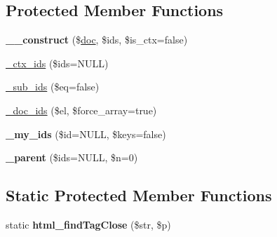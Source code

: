 \subsection*{Protected Member Functions}
\begin{DoxyCompactItemize}
\item 
\mbox{\label{classduzun_1_1hQuery_1_1Node_aab1867ee99ebcff2d6d7c85e953ffeec}} 
{\bfseries \+\_\+\+\_\+construct} (\$\mbox{\hyperlink{classduzun_1_1hQuery_1_1Node_abd060c044c66e49189d8e4fb491f3b3d}{doc}}, \$ids, \$is\+\_\+ctx=false)
\item 
\mbox{\hyperlink{classduzun_1_1hQuery_1_1Node_aec6b6185b6dfc245eca4364aa71000d1}{\+\_\+ctx\+\_\+ids}} (\$ids=N\+U\+LL)
\item 
\mbox{\hyperlink{classduzun_1_1hQuery_1_1Node_a4811866997e1bf7f09c1c5e05f37242d}{\+\_\+sub\+\_\+ids}} (\$eq=false)
\item 
\mbox{\hyperlink{classduzun_1_1hQuery_1_1Node_a3d9fe0b2908818d7d8feef2e55405d03}{\+\_\+doc\+\_\+ids}} (\$el, \$force\+\_\+array=true)
\item 
\mbox{\label{classduzun_1_1hQuery_1_1Node_aefa8cc7452d31e55b577b9682a90220d}} 
{\bfseries \+\_\+my\+\_\+ids} (\$id=N\+U\+LL, \$keys=false)
\item 
\mbox{\label{classduzun_1_1hQuery_1_1Node_a6225da6eb229da82c79b1ffbc644a984}} 
{\bfseries \+\_\+parent} (\$ids=N\+U\+LL, \$n=0)
\end{DoxyCompactItemize}
\subsection*{Static Protected Member Functions}
\begin{DoxyCompactItemize}
\item 
\mbox{\label{classduzun_1_1hQuery_1_1Node_a6ac31707fc7d72635dc66e28af7955d2}} 
static {\bfseries html\+\_\+find\+Tag\+Close} (\$str, \$p)
\end{DoxyCompactItemize}
